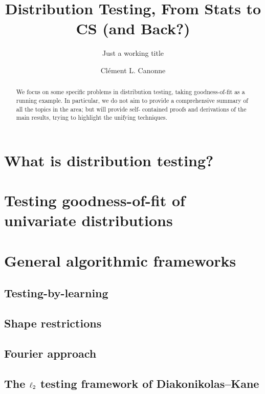 \documentclass[biber,draft]{nowfnt} %
\title{Distribution Testing, From Stats to CS (and Back?)}
\subtitle{Just a working title}
\author[1]{Cl\'ement L. Canonne}
\affil[1]{University of Sydney; clement.canonne@sydney.edu.au}
\begin{document}
\makeabstracttitle
\begin{abstract}
We focus on some specific problems in distribution testing,
taking goodness-of-fit as a running example. In particular,
we do not aim to provide a comprehensive summary of all
the topics in the area; but will provide self-
contained proofs and derivations of the main results, trying
to highlight the unifying techniques.
\end{abstract}

\chapter{What is distribution testing?}



\chapter{Testing goodness-of-fit of univariate distributions}
  \label{chap:identity}




\chapter{General algorithmic frameworks}
\section{Testing-by-learning}
\section{Shape restrictions}
\section{Fourier approach}
\section{The $\lp[2]$ testing framework of Diakonikolas--Kane}
\end{document}
